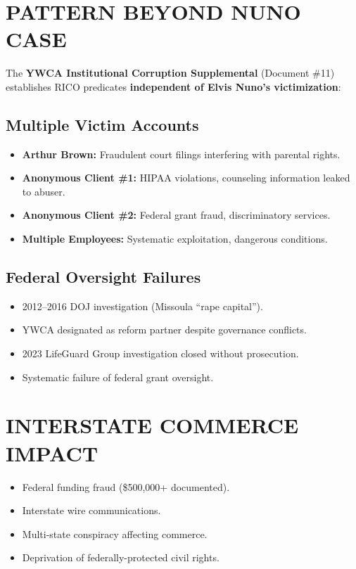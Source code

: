 \documentclass[12pt,oneside]{article}
\begin{document}
\begin{flushleft}
\section*{PATTERN BEYOND NUNO CASE}

The \textbf{YWCA Institutional Corruption Supplemental} (Document \#11) establishes RICO predicates \textbf{independent of Elvis Nuno's victimization}:

\subsection*{Multiple Victim Accounts}

\begin{itemize}
\item \textbf{Arthur Brown:} Fraudulent court filings interfering with parental rights.
\item \textbf{Anonymous Client \#1:} HIPAA violations, counseling information leaked to abuser.
\item \textbf{Anonymous Client \#2:} Federal grant fraud, discriminatory services.
\item \textbf{Multiple Employees:} Systematic exploitation, dangerous conditions.
\end{itemize}

\subsection*{Federal Oversight Failures}

\begin{itemize}
\item 2012--2016 DOJ investigation (Missoula ``rape capital'').
\item YWCA designated as reform partner despite governance conflicts.
\item 2023 LifeGuard Group investigation closed without prosecution.
\item Systematic failure of federal grant oversight.
\end{itemize}

\section*{INTERSTATE COMMERCE IMPACT}

\begin{itemize}
\item Federal funding fraud (\$500,000+ documented).
\item Interstate wire communications.
\item Multi-state conspiracy affecting commerce.
\item Deprivation of federally-protected civil rights.
\end{itemize}


\end{flushleft}
\end{document}
